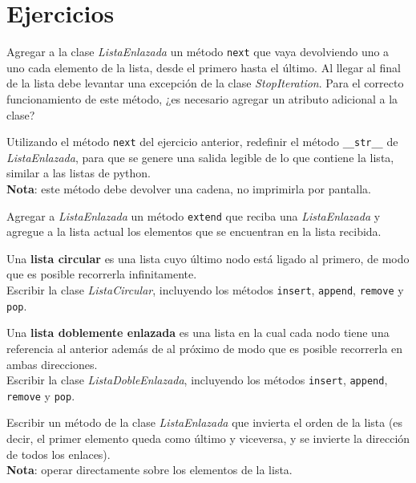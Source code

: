 \newpage
\section{Ejercicios}

\begin{ejercicio}
Agregar a la clase {\it ListaEnlazada} un método \verb!next! que vaya
devolviendo uno a uno cada elemento de la lista, desde el primero hasta el
último.  Al llegar al final de la lista debe levantar una excepción de la
clase {\it StopIteration}.  Para el correcto funcionamiento de este método, ¿es
necesario agregar un atributo adicional a la clase?
\end{ejercicio}

\begin{ejercicio}
Utilizando el método \verb!next! del ejercicio anterior, redefinir el
método \verb!__str__! de {\it ListaEnlazada}, para que se genere una salida
legible de lo que contiene la lista, similar a las listas de python. \\
{\bf Nota}: este método debe devolver una cadena, no imprimirla por
pantalla.
\end{ejercicio}

\begin{ejercicio}
Agregar a {\it ListaEnlazada} un método \verb!extend! que reciba una {\it
ListaEnlazada} y agregue a la lista actual los elementos que se encuentran
en la lista recibida.
\end{ejercicio}

%

\begin{ejercicio}
Una {\bf lista circular} es una lista cuyo último nodo está ligado al primero,
de modo que es posible recorrerla infinitamente.  \\
Escribir la clase {\it ListaCircular}, incluyendo los métodos \verb!insert!,
\verb!append!, \verb!remove! y \verb!pop!.
\end{ejercicio}

\begin{ejercicio}
Una {\bf lista doblemente enlazada} es una lista en la cual cada nodo tiene
una referencia al anterior además de al próximo de modo que es posible
recorrerla en ambas direcciones. \\
Escribir la clase {\it ListaDobleEnlazada}, incluyendo los métodos
\verb!insert!, \verb!append!, \verb!remove! y \verb!pop!.
\end{ejercicio}

\begin{ejercicio}
Escribir un método de la clase {\it ListaEnlazada} que invierta el orden
de la lista (es decir, el primer elemento queda como último y
viceversa, y se invierte la dirección de todos los enlaces). \\
{\bf Nota}: operar directamente sobre los elementos de la lista.
\end{ejercicio}

